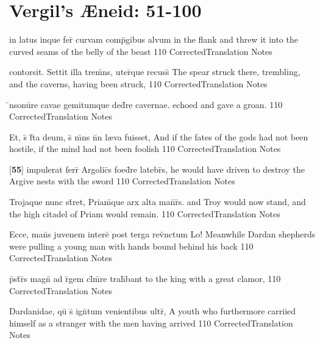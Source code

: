 \section{Vergil's {\AE}neid: 51-100} %

\latline
  {in latus inque fer\={\macron {\i}} curvam comp\={}gibus alvum}
  { in the flank and threw it into the curved seams of the belly of the beast }
  {110}
  { CorrectedTranslation }
  { Notes }


\latline
  {contorsit.  Settit illa trem\={}ns, uter\={}que recuss\={}}
  { The spear struck there, trembling, and the caverns, having been struck, }
  {110}
  { CorrectedTranslation }
  { Notes }


\latline
  {\={\macron {\i}}nsonu\={}re cavae gemitumque ded\={}re cavernae.}
  { echoed and gave a groan. }
  {110}
  { CorrectedTranslation }
  { Notes }


\latline
  {Et, s\={\macron {\i}} f\={}ta deum, s\={\macron {\i}} m\={}ns n\={}n l{\ae}va fuisset,}
  { And if the fates of the gods had not been hostile, if the mind had not been foolish  }
  {110}
  { CorrectedTranslation }
  { Notes }


\latline
  {[\textbf{55}] impulerat ferr\={} Argolic\={}s foed\={}re latebr\={}s,}
  { he would have driven to destroy the Argive nests with the sword }
  {110}
  { CorrectedTranslation }
  { Notes }


\latline
  {Trojaque nunc st\={}ret, Priam\={\macron {\i}}que arx alta man\={}r\={}s.}
  { and Troy would now stand, and the high citadel of Priam would remain. }
  {110}
  { CorrectedTranslation }
  { Notes }


\latline
  {Ecce, man\={}s juvenem intere\={} post terga rev\={\macron {\i}}nctum}
  { Lo!  Meanwhile Dardan shepherds were pulling a young man with hands bound behind his back }
  {110}
  { CorrectedTranslation }
  { Notes }


\latline
  {p\={}st\={}r\={}s magn\={} ad r\={}gem cl\={}m\={}re trah\={}bant}
  { to the king with a great clamor,  }
  {110}
  { CorrectedTranslation }
  { Notes }


\latline
  {Dardanidae, qu\={\macron {\i}} s\={} ign\={}tum venientibus ultr\={},}
  { A youth who furthermore carriied himself as a stranger with the men having arrived }
  {110}
  { CorrectedTranslation }
  { Notes }


